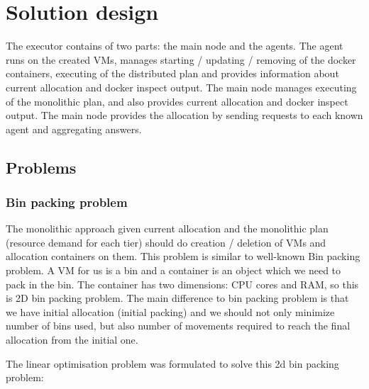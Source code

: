 \chapter{Solution design}
\label {solutiondesign}

The executor contains of two parts: the main node and the agents. The agent runs on the created VMs, manages starting / updating / removing of the docker containers, executing of the distributed plan and provides information about current allocation and docker inspect output. The main node manages executing of the monolithic plan, and also provides current allocation and docker inspect output. The main node provides the allocation by sending requests to each known agent and aggregating answers.

\section{Problems}
\subsection{Bin packing problem}
  The monolithic approach given current allocation and the monolithic plan (resource demand for each tier) should do creation / deletion of VMs and allocation containers on them. This problem is similar to well-known Bin packing problem. A VM for us is a bin and a container is an object which we need to pack in the bin. The container has two dimensions: CPU cores and RAM, so this is 2D bin packing problem. The main difference to bin packing problem is that we have initial allocation (initial packing) and we should not only minimize number of bins used, but also number of movements required to reach the final allocation from the initial one.
  
  The linear optimisation problem was formulated to solve this 2d bin packing problem:
  

